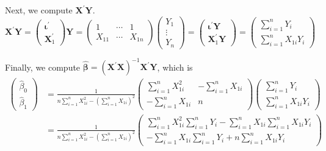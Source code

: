 \documentclass[a4paper,11pt]{article}
\begin{document}
Next, we compute \(\mathbf{X}^{\prime} \mathbf{Y}\).
\begin{equation*}
\mathbf{X}^{\prime} \mathbf{Y} =
\begin{pmatrix}
\boldsymbol{\iota}^{\prime} \\
\mathbf{X}_1^{\prime}
\end{pmatrix}
\mathbf{Y} =
\begin{pmatrix}
1 & \cdots & 1 \\
X_{11} & \cdots & X_{1n}
\end{pmatrix}
\begin{pmatrix}
Y_1 \\
\vdots \\
Y_n
\end{pmatrix} =
\begin{pmatrix}
\boldsymbol{\iota}^{\prime} \mathbf{Y} \\
\mathbf{X}_1^{\prime} \mathbf{Y}
\end{pmatrix} =
\begin{pmatrix}
\sum_{i=1}^n Y_i \\
\sum_{i=1}^n X_{1i} Y_i
\end{pmatrix}
\end{equation*}

Finally, we compute \(\boldsymbol{\hat{\beta}} = (\mathbf{X}^{\prime}
\mathbf{X})^{-1} \mathbf{X}^{\prime} \mathbf{Y}\), which is
\begin{align*}
\begin{pmatrix}
\hat{\beta}_0 \\
\hat{\beta}_1
\end{pmatrix} & =
\frac{1}{n \sum_{i=1}^n X_{1i}^2 - (\sum_{i=1}^n X_{1i})^2}
\begin{pmatrix}
\sum_{i=1}^n X_{1i}^2 & - \sum_{i=1}^n X_{1i} \\
-\sum_{i=1}^n X_{1i} & n
\end{pmatrix}
\begin{pmatrix}
\sum_{i=1}^n Y_i \\
\sum_{i=1}^n X_{1i} Y_i
\end{pmatrix} \\
& =
\frac{1}{n \sum_{i=1}^n X_{1i}^2 - (\sum_{i=1}^n X_{1i})^2}
\begin{pmatrix}
\sum_{i=1}^n X_{1i}^2 \sum_{i=1}^n Y_i - \sum_{i=1}^n X_{1i} \sum_{i=1}^n X_{1i}Y_i \\
-\sum_{i=1}^n X_{1i} \sum_{i=1}^n Y_i + n \sum_{i=1}^n X_{1i} Y_i
\end{pmatrix}
\end{align*}
\end{document}
